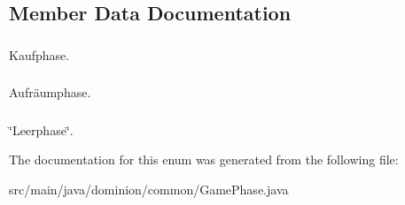 \subsection{\-Member \-Data \-Documentation}
\hypertarget{enumdominion_1_1common_1_1GamePhase_ad567ac6ff14860ffc74695488af68331}{
\subsubsection[{\-Buy}]{}}\label{enumdominion_1_1common_1_1GamePhase_ad567ac6ff14860ffc74695488af68331}
\-Kaufphase. \hypertarget{enumdominion_1_1common_1_1GamePhase_ae85d692de30853312cab6c1d88b2b7f2}{
\subsubsection[{\-Clean\-Up}]{}}\label{enumdominion_1_1common_1_1GamePhase_ae85d692de30853312cab6c1d88b2b7f2}
\-Aufräumphase. \hypertarget{enumdominion_1_1common_1_1GamePhase_aaba471fc5657c8579b51322c9f03dc72}{
\subsubsection[{\-None}]{}}\label{enumdominion_1_1common_1_1GamePhase_aaba471fc5657c8579b51322c9f03dc72}
\char`\"{}\-Leerphase\char`\"{}. 

\-The documentation for this enum was generated from the following file\-:\begin{DoxyCompactItemize}
\item 
src/main/java/dominion/common/\-Game\-Phase.\-java\end{DoxyCompactItemize}
